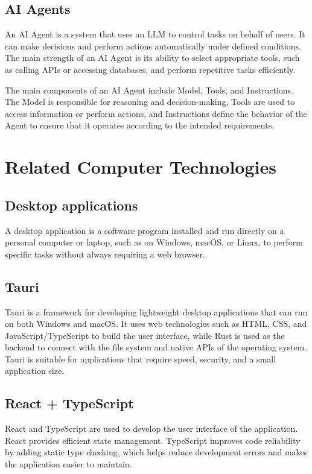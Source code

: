 \documentclass[12pt,oneside,openright,a4paper]{cpe-english-project}
\begin{document}
\subsection{AI Agents}
An AI Agent is a system that uses an LLM to control tasks on behalf of users. It can make decisions and perform actions automatically under defined conditions. The main strength of an AI Agent is its ability to select appropriate tools, such as calling APIs or accessing databases, and perform repetitive tasks efficiently.

The main components of an AI Agent include Model, Tools, and Instructions. The Model is responsible for reasoning and decision-making, Tools are used to access information or perform actions, and Instructions define the behavior of the Agent to ensure that it operates according to the intended requirements.

\section{Related Computer Technologies}
\subsection{Desktop applications}
A desktop application is a software program installed and run directly on a personal computer or laptop, such as on Windows, macOS, or Linux, to perform specific tasks without always requiring a web browser.

\subsection{Tauri}
Tauri is a framework for developing lightweight desktop applications that can run on both Windows and macOS. It uses web technologies such as HTML, CSS, and JavaScript/TypeScript to build the user interface, while Rust is used as the backend to connect with the file system and native APIs of the operating system. Tauri is suitable for applications that require speed, security, and a small application size.

\subsection{React + TypeScript}
React and TypeScript are used to develop the user interface of the application. React provides efficient state management. TypeScript improves code reliability by adding static type checking, which helps reduce development errors and makes the application easier to maintain.
\end{document}
